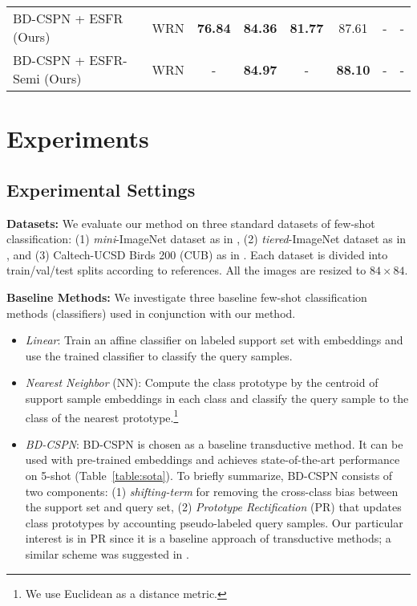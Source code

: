 \documentclass{article}
\begin{document}
\begin{table*}[t]
\begin{small}
\begin{center}
\begin{tabular}{lccccccc}
				\rowcolor[HTML]{EFEFEF} BD-CSPN + ESFR (Ours) & WRN               & \textbf{76.84}       & \textbf{84.36}      & \textbf{81.77}        & 87.61       & -               & -               \\
				\rowcolor[HTML]{EFEFEF} BD-CSPN + ESFR-Semi (Ours) & WRN               & -       & \textbf{84.97}      & -        & \textbf{88.10}       & -               & -               \\ \hline
\end{tabular}
		\end{center}
	\end{small}
	\vskip -0.2in
\end{table*} \section{Experiments}
\subsection{Experimental Settings}
\textbf{Datasets:}
We evaluate our method on three standard datasets of few-shot classification: (1) \textit{mini}-ImageNet \cite{vinyals2016matching} dataset as in \citet{ravi2016optimization}, (2) \textit{tiered}-ImageNet dataset as in \citet{ren2018metalearning}, and (3) Caltech-UCSD Birds 200 (CUB) \cite{welinder2010caltech} as in \citet{Chen19}. Each dataset is divided into train/val/test splits according to references. All the images are resized to $84\times84$.

\textbf{Baseline Methods:}
We investigate three baseline few-shot classification methods (classifiers) used in conjunction with our method.
\begin{itemize}[leftmargin=*]
	\vspace{-0.1in}
	\item \textit{Linear}: Train an affine classifier on labeled support set with embeddings and use the trained classifier to classify the query samples.
	\item \textit{Nearest Neighbor} (NN): Compute the class prototype by the centroid of support sample embeddings in each class and classify the query sample to the class of the nearest prototype.\footnote{We use Euclidean as a distance metric.}
	\item \textit{BD-CSPN}: BD-CSPN \cite{BDCSPN} is chosen as a baseline transductive method.
	It can be used with pre-trained embeddings and achieves state-of-the-art performance on 5-shot (Table~\ref{table:sota}).
	To briefly summarize, BD-CSPN consists of two components: (1) \textit{shifting-term} for removing the cross-class bias between the support set and query set, (2) \textit{Prototype Rectification} (PR) that updates class prototypes by accounting pseudo-labeled query samples.
	Our particular interest is in PR since it is a baseline approach of transductive methods; a similar scheme was suggested in \citet{ren2018metalearning, CAN}.
\end{itemize}
\end{document}
